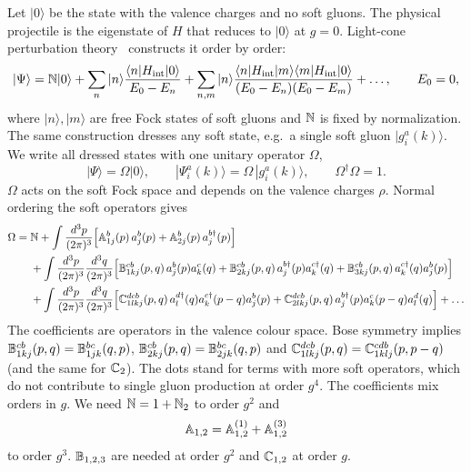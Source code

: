 Let $|0\rangle$ be the state with the valence charges and no soft gluons. The physical projectile is the eigenstate of $H$ that reduces to $|0\rangle$ at $g=0$. Light-cone perturbation theory~\cite{Lepage:1980fj,Brodsky:1997de} constructs it order by order:
\begin{equation}
|\Psi\rangle=\mathbb{N}|0\rangle+\sum_n|n\rangle\frac{\langle n|H_{\rm int}|0\rangle}{E_0-E_n}+\sum_{n,m}|n\rangle\frac{\langle n|H_{\rm int}|m\rangle\langle m|H_{\rm int}|0\rangle}{(E_0-E_n)(E_0-E_m)}+\dots,\qquad E_0=0,
\label{eq:LCPT}
\end{equation}
where $|n\rangle,|m\rangle$ are free Fock states of soft gluons and $\mathbb{N}$ is fixed by normalization. The same construction dresses any soft state, e.g.\ a single soft gluon $|g^a_i(k)\rangle$. We write all dressed states with one unitary operator $\Omega$,
\begin{equation}
|\Psi\rangle=\Omega|0\rangle,\qquad |\Psi^a_i(k)\rangle=\Omega\,|g^a_i(k)\rangle,\qquad \Omega^\dagger\Omega=1.
\label{eq:Omegadef}
\end{equation}
$\Omega$ acts on the soft Fock space and depends on the valence charges $\rho$. Normal ordering the soft operators gives~\cite{Lublinsky:2016meo}
\begin{align}
\Omega={}&\mathbb{N}+\int\frac{d^3p}{(2\pi)^3}\Big[\mathbb{A}^b_{1j}(p)\,a^b_j(p)+\mathbb{A}^b_{2j}(p)\,a^{b\dagger}_j(p)\Big]\notag\\
&+\int\frac{d^3p}{(2\pi)^3}\frac{d^3q}{(2\pi)^3}\Big[\mathbb{B}^{cb}_{1kj}(p,q)\,a^b_j(p)a^c_k(q)+\mathbb{B}^{cb}_{2kj}(p,q)\,a^{b\dagger}_j(p)a^{c\dagger}_k(q)+\mathbb{B}^{cb}_{3kj}(p,q)\,a^{c\dagger}_k(q)a^b_j(p)\Big]\notag\\
&+\int\frac{d^3p}{(2\pi)^3}\frac{d^3q}{(2\pi)^3}\Big[\mathbb{C}^{dcb}_{1lkj}(p,q)\,a^{d\dagger}_l(q)a^{c\dagger}_k(p-q)a^b_j(p)+\mathbb{C}^{dcb}_{2lkj}(p,q)\,a^{b\dagger}_j(p)a^c_k(p-q)a^d_l(q)\Big]+\dots
\label{eq:OmegaExp}
\end{align}
The coefficients are operators in the valence colour space. Bose symmetry implies $\mathbb{B}^{cb}_{1kj}(p,q)=\mathbb{B}^{bc}_{1jk}(q,p)$, $\mathbb{B}^{cb}_{2kj}(p,q)=\mathbb{B}^{bc}_{2jk}(q,p)$ and $\mathbb{C}^{dcb}_{1lkj}(p,q)=\mathbb{C}^{cdb}_{1klj}(p,p-q)$ (and the same for $\mathbb{C}_2$). The dots stand for terms with more soft operators, which do not contribute to single gluon production at order $g^4$. The coefficients mix orders in $g$. We need $\mathbb{N}=1+\mathbb{N}_2$ to order $g^2$ and
\begin{equation}
\mathbb{A}_{1,2}=\mathbb{A}^{(1)}_{1,2}+\mathbb{A}^{(3)}_{1,2}
\end{equation}
to order $g^3$. $\mathbb{B}_{1,2,3}$ are needed at order $g^2$ and $\mathbb{C}_{1,2}$ at order $g$.

